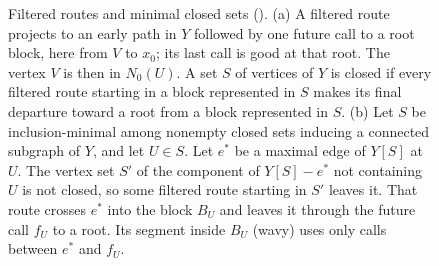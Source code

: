 \documentclass[USenglish, a4paper, thm-restate,numberwithinsect, cleveref]{lipics-v2021}
\begin{document}
\begin{figure}[t]
\caption{Filtered routes and minimal closed sets
().
(a) A filtered route projects to an early path in $Y$ followed by one
future call to a root block, here from $V$ to $x_0$; its last call is good
at that root. The vertex $V$ is then in $N_0(U)$. A set $S$ of vertices of
$Y$ is closed if every filtered route starting in a block represented
in $S$ makes its final departure toward a root from a block represented
in $S$. (b) Let $S$ be inclusion-minimal among nonempty closed sets
inducing a connected subgraph of $Y$, and let $U\in S$. Let $e^*$ be a
maximal edge of $Y[S]$ at $U$. The vertex set $S'$ of the
component of $Y[S]-e^*$ not containing $U$ is not closed, so some filtered route
starting in $S'$ leaves it. That route crosses $e^*$ into the block $B_U$
and leaves it through the future call $f_U$ to a root. Its segment inside
$B_U$ (wavy) uses only calls between $e^*$ and $f_U$.}
\label{fig:filtered-routes}
\end{figure}
\end{document}
